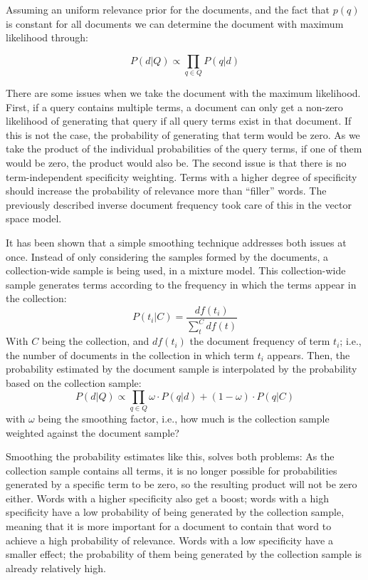 Assuming an uniform relevance prior for the documents, and the fact  that $p(q)$ is constant for all documents we can determine the document with maximum likelihood through:  

\begin{equation}
	P(d|Q)  \propto \prod_{q \in Q} P(q | d)
\end{equation}

There are some issues when we take the document with the maximum likelihood. First, if a query contains multiple terms, a document can only get a non-zero likelihood of generating that query if all query terms exist in that document. If this is not the case, the probability of generating that term would be zero. As we take the product of the individual probabilities of the query terms, if one of them would be zero, the product would also be. The second issue is that there is no term-independent specificity weighting. Terms with a higher degree of specificity should increase the probability of relevance more than ``filler'' words. The previously described inverse document frequency took care of this in the vector space model.

It has been shown that a simple smoothing technique addresses both issues at once. Instead of only considering the samples formed by the documents, a collection-wide sample is being used, in a mixture model. This collection-wide sample generates terms according to the frequency in which the terms appear in the collection:
\begin{equation}
	P(t_i|C) = \frac{\mathit{df}(t_i)}{\sum_t^C \mathit{df}(t)}
\end{equation}
With $C$ being the collection, and $df(t_i)$ the document frequency of term $t_i$; i.e., the number of documents in the collection in which term $t_i$ appears. Then, the probability estimated by the document sample is interpolated by the probability based on the collection sample:
\begin{equation}
	P(d|Q) \propto \prod_{q \in Q} \omega \cdot P(q | d) + (1 - \omega) \cdot P(q | C) 
\end{equation}
with $\omega$ being the smoothing factor, i.e., how much is the collection sample weighted against the document sample?

Smoothing the probability estimates like this, solves both problems: As the collection sample contains all terms, it is no longer possible for probabilities generated by a specific term to be zero, so the resulting product will not be zero either. Words with a higher specificity also get a boost; words with a high specificity have a low probability of being generated by the collection sample, meaning that it is more important for a document to contain that word to achieve a high probability of relevance. Words with a low specificity have a smaller effect; the probability of them being generated by the collection sample is already relatively high. 

